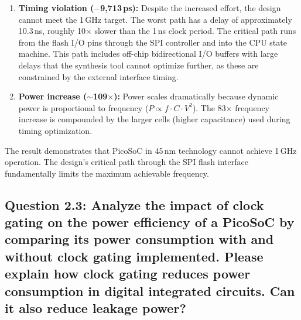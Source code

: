 \documentclass{article}
\begin{document}
\begin{tcolorbox}[colback=white, colframe=black, width=\textwidth, title=Answer 2.2]
\begin{enumerate}
\item \textbf{Timing violation ($-$9{,}713\,ps):} Despite the increased effort, the design cannot meet the 1\,GHz target. The worst path has a delay of approximately 10.3\,ns, roughly 10$\times$ slower than the 1\,ns clock period. The critical path runs from the flash I/O pins through the SPI controller and into the CPU state machine. This path includes off-chip bidirectional I/O buffers with large delays that the synthesis tool cannot optimize further, as these are constrained by the external interface timing.

\item \textbf{Power increase ($\sim$109$\times$):} Power scales dramatically because dynamic power is proportional to frequency ($P \propto f \cdot C \cdot V^2$). The 83$\times$ frequency increase is compounded by the larger cells (higher capacitance) used during timing optimization.
\end{enumerate}

\vspace{0.1cm}
The result demonstrates that PicoSoC in 45\,nm technology cannot achieve 1\,GHz operation. The design's critical path through the SPI flash interface fundamentally limits the maximum achievable frequency.

\end{tcolorbox}

\newpage

\subsection*{Question 2.3: Analyze the impact of clock gating on the power efficiency of a PicoSoC by comparing its power consumption with and without clock gating implemented. Please explain how clock gating reduces power consumption in digital integrated circuits. Can it also reduce leakage power?}
\end{document}

